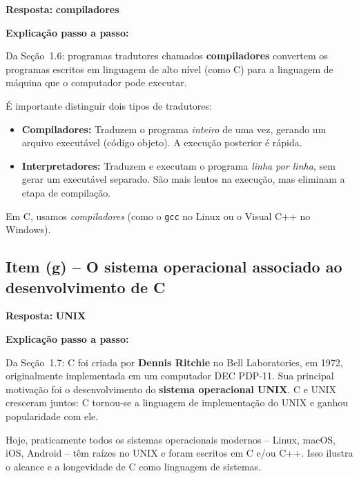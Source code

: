 \documentclass[12pt,a4paper]{article}
\begin{document}
\begin{respostabox}
\textbf{Resposta:} \textcolor{deitelblue}{\textbf{compiladores}}

\medskip
\textbf{Explicação passo a passo:}

Da Seção~1.6: programas tradutores chamados \textbf{compiladores} convertem os programas
escritos em linguagem de alto nível (como C) para a linguagem de máquina que o computador
pode executar.

É importante distinguir dois tipos de tradutores:
\begin{itemize}
  \item \textbf{Compiladores:} Traduzem o programa \textit{inteiro} de uma vez, gerando um
  arquivo executável (código objeto). A execução posterior é rápida.
  \item \textbf{Interpretadores:} Traduzem e executam o programa \textit{linha por linha},
  sem gerar um executável separado. São mais lentos na execução, mas eliminam a etapa
  de compilação.
\end{itemize}

Em C, usamos \textit{compiladores} (como o \texttt{gcc} no Linux ou o Visual C++ no Windows).
\end{respostabox}

\bigskip

\subsection*{Item (g) -- O sistema operacional associado ao desenvolvimento de C}

\begin{respostabox}
\textbf{Resposta:} \textcolor{deitelblue}{\textbf{UNIX}}

\medskip
\textbf{Explicação passo a passo:}

Da Seção~1.7: C foi criada por \textbf{Dennis Ritchie} no Bell Laboratories, em 1972,
originalmente implementada em um computador DEC PDP-11. Sua principal motivação foi o
desenvolvimento do \textbf{sistema operacional UNIX}. C e UNIX cresceram juntos: C tornou-se
a linguagem de implementação do UNIX e ganhou popularidade com ele.

Hoje, praticamente todos os sistemas operacionais modernos -- Linux, macOS, iOS, Android --
têm raízes no UNIX e foram escritos em C e/ou C++. Isso ilustra o alcance e a longevidade
de C como linguagem de sistemas.
\end{respostabox}

\bigskip
\end{document}
